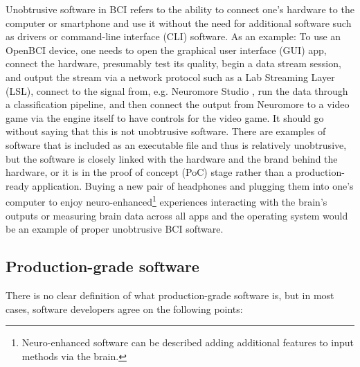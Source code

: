 Unobtrusive software in BCI refers to the ability to connect one's hardware to the computer or smartphone and use it without the need for additional software such as drivers or command-line interface (CLI) software. As an example: To use an OpenBCI device, one needs to open the graphical user interface (GUI) app, connect the hardware, presumably test its quality, begin a data stream session, and output the stream via a network protocol such as a Lab Streaming Layer (LSL), connect to the signal from, e.g. Neuromore Studio \citep{openbci_neuromore_nodate}, run the data through a classification pipeline, and then connect the output from Neuromore to a video game via the engine itself to have controls for the video game. It should go without saying that this is not unobtrusive software. There are examples of software that is included as an executable file and thus is relatively unobtrusive, but the software is closely linked with the hardware and the brand behind the hardware, or it is in the proof of concept (PoC) stage rather than a production-ready application. Buying a new pair of headphones and plugging them into one's computer to enjoy neuro-enhanced\footnote{Neuro-enhanced software can be described adding additional features to input methods via the brain.} experiences interacting with the brain's outputs or measuring brain data across all apps and the operating system would be an example of proper unobtrusive BCI software.

\subsection{Production-grade software}
\label{chapter2-production-grade-software}

There is no clear definition of what production-grade software is, but in most cases, software developers agree on the following points:

